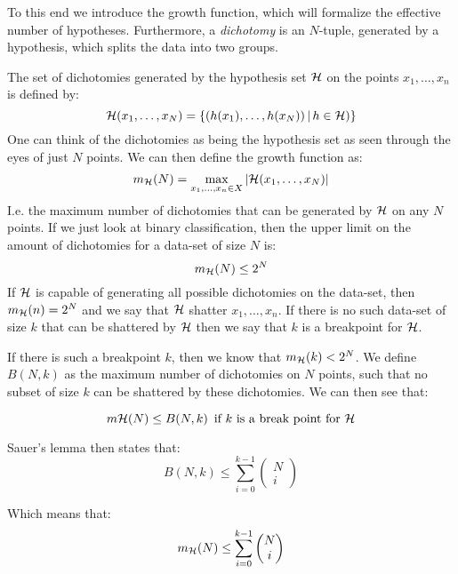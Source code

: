     To this end we introduce the growth function, which will formalize the 
    effective number of hypotheses. Furthermore, a \textit{dichotomy} is an 
    $N$-tuple, generated by a hypothesis, which splits the data into two 
    groups.
    
    The set of dichotomies generated by the hypothesis set $\mathcal{H}$ on the points 
    $x_1,\dots,x_n$ is defined by:
    \begin{equation}
    \mathcal{H}(x_1,\dots,x_N)= \{(h(x_1),\dots,h(x_N)) \,|\, h \in \mathcal{H})\}
    \end{equation}
    One can think of the dichotomies as being the hypothesis set as seen 
    through the eyes of just $N$ points. We can then define the growth function 
    as:
    \begin{equation}
    m_{\mathcal{H}}(N)=\max\limits_{x_1, \dots, x_n \in X} |\mathcal{H}(x_1,\dots, x_N)|
    \end{equation}
    I.e. the maximum number of dichotomies that can be generated by $\mathcal{H}$ on 
    any $N$ points. If we just look at binary classification, then the upper 
    limit on the amount of dichotomies for a data-set of size $N$ is: 
    \begin{equation}
    m_{\mathcal{H}}(N) \leq 2^N
    \end{equation}
    If $\mathcal{H}$ is capable of generating all possible dichotomies on the data-set, 
    then $m_{\mathcal{H}}(n) = 2^N$ and we say that $\mathcal{H}$ shatter $x_1,\dots,x_n$. If 
    there is no such data-set of size $k$ that can be shattered by $\mathcal{H}$ then 
    we say that $k$ is a breakpoint for $\mathcal{H}$.
    
    If there is such a breakpoint $k$, then we know that $m_{\mathcal{H}}(k) < 2^N$. We 
    define $B(N,k)$ as the maximum number of dichotomies on $N$ points, such 
    that no subset of size $k$ can be shattered by these dichotomies. We can 
    then see that:
    
    \begin{equation*}
    m\mathcal{H}(N) \leq B(N,k)\, \text{ if $k$ is a break point for }\mathcal{H}
    \end{equation*}
    
    Sauer's lemma then states that:
    \begin{equation*}
    B(N,k) \leq \sum_{i=0}^{k-1}\begin{pmatrix}
    N\\
    i
    \end{pmatrix}
    \end{equation*}
    
    Which means that:
    \begin{equation*}
        m_{\mathcal{H}}(N) \leq \sum_{i=0}^{k-1} \begin{pmatrix}
        N\\i
        \end{pmatrix}
    \end{equation*}
    
